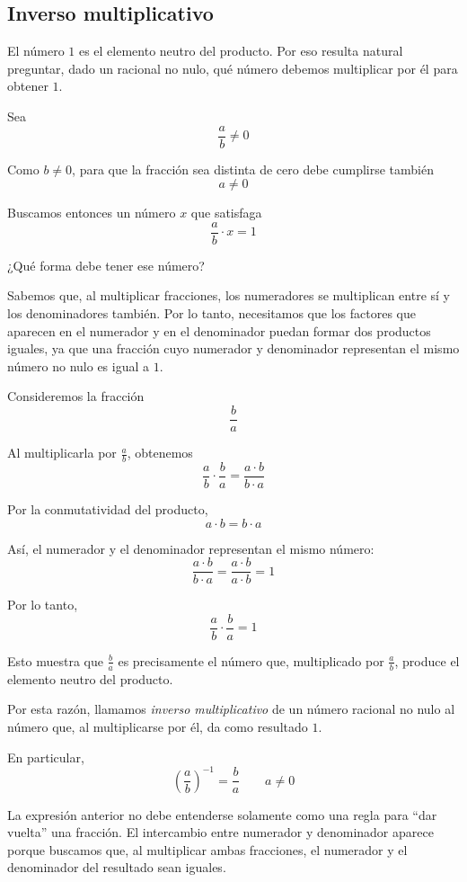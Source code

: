 \subsection{Inverso multiplicativo}

El número \(1\) es el elemento neutro del producto. Por eso resulta natural preguntar, dado un racional no nulo, qué número debemos multiplicar por él para obtener \(1\).

Sea
\[
\frac{a}{b}\ne0
\]

Como \(b\ne0\), para que la fracción sea distinta de cero debe cumplirse también
\[
a\ne0
\]

Buscamos entonces un número \(x\) que satisfaga
\[
\frac{a}{b}\cdot x=1
\]

¿Qué forma debe tener ese número?

Sabemos que, al multiplicar fracciones, los numeradores se multiplican entre sí y los denominadores también. Por lo tanto, necesitamos que los factores que aparecen en el numerador y en el denominador puedan formar dos productos iguales, ya que una fracción cuyo numerador y denominador representan el mismo número no nulo es igual a \(1\).

Consideremos la fracción
\[
\frac{b}{a}
\]

Al multiplicarla por \(\frac{a}{b}\), obtenemos
\[
\frac{a}{b}\cdot\frac{b}{a}
=
\frac{a\cdot b}{b\cdot a}
\]

Por la conmutatividad del producto,
\[
a\cdot b=b\cdot a
\]

Así, el numerador y el denominador representan el mismo número:
\[
\frac{a\cdot b}{b\cdot a}
=
\frac{a\cdot b}{a\cdot b}
=
1
\]

Por lo tanto,
\[
\frac{a}{b}\cdot\frac{b}{a}=1
\]

Esto muestra que \(\frac{b}{a}\) es precisamente el número que, multiplicado por \(\frac{a}{b}\), produce el elemento neutro del producto.

Por esta razón, llamamos \emph{inverso multiplicativo} de un número racional no nulo al número que, al multiplicarse por él, da como resultado \(1\).

En particular,
\[
\boxed{
\left(\frac{a}{b}\right)^{-1}
=
\frac{b}{a}
}
\qquad
a\ne0
\]

La expresión anterior no debe entenderse solamente como una regla para ``dar vuelta'' una fracción. El intercambio entre numerador y denominador aparece porque buscamos que, al multiplicar ambas fracciones, el numerador y el denominador del resultado sean iguales.


